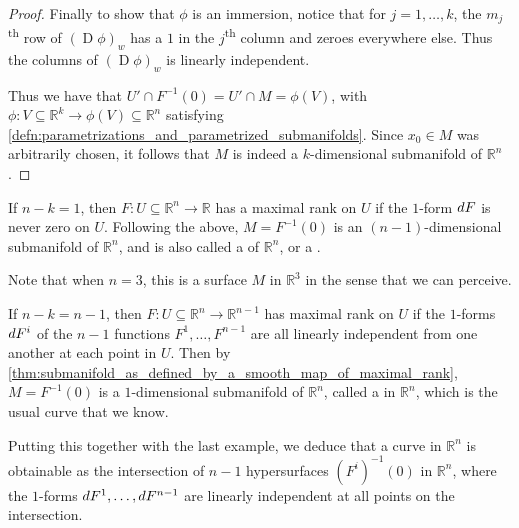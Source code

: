 \documentclass[notoc,notitlepage]{tufte-book}
\DeclareMathOperator{\D}{D}
\begin{document}
\begin{proof}
  Finally to show that $\phi$ is an immersion, notice that for $j = 1, \ldots,
  k$, the $m_j$\textsuperscript{th} row of $(\D \phi)_w$ has a $1$ in the
  $j$\textsuperscript{th} column and zeroes everywhere else. Thus the columns of
  $(\D \phi)_w$ is linearly independent.

  Thus we have that $U' \cap F^{-1}(0) = U' \cap M = \phi(V)$, with $\phi : V
  \subseteq \mathbb{R}^k \to \phi(V) \subseteq \mathbb{R}^n$ satisfying
  \cref{defn:parametrizations_and_parametrized_submanifolds}. Since $x_0 \in M$
  was arbitrarily chosen, it follows that $M$ is indeed a $k$-dimensional
  submanifold of $\mathbb{R}^n$.
\end{proof}

\begin{eg}
  If $n - k = 1$, then $F : U \subseteq \mathbb{R}^n \to \mathbb{R}$ has a
  maximal rank on $U$ if the $1$-form $\mathop{}\!d{F}$ is never zero on $U$. Following
  the above, $M = F^{-1}(0)$ is an $(n - 1)$-dimensional submanifold of
  $\mathbb{R}^n$, and is also called a  of $\mathbb{R}^n$,
  or a .

  Note that when $n = 3$, this is a surface $M$ in $\mathbb{R}^3$ in the sense
  that we can perceive.
\end{eg}

\begin{eg}
  If $n - k = n - 1$, then $F : U \subseteq \mathbb{R}^n \to \mathbb{R}^{n - 1}$
  has maximal rank on $U$ if the $1$-forms $\mathop{}\!d{F}^i$ of the $n - 1$ functions
  $F^1, \ldots, F^{n - 1}$ are all linearly independent from one another at each
  point in $U$. Then by
  \cref{thm:submanifold_as_defined_by_a_smooth_map_of_maximal_rank}, $M =
  F^{-1}(0)$ is a $1$-dimensional submanifold of $\mathbb{R}^n$, called a
   in $\mathbb{R}^n$, which is the usual curve that we know.

  Putting this together with the last example, we deduce that a curve in
  $\mathbb{R}^n$ is obtainable as the intersection of $n - 1$ hypersurfaces
  $(F^i)^{-1}(0)$ in $\mathbb{R}^n$, where the $1$-forms $\mathop{}\!d{F}^1, \ldots,
  \mathop{}\!d{F}^{n - 1}$ are linearly independent at all points on the intersection.
\end{eg}
\end{document}
